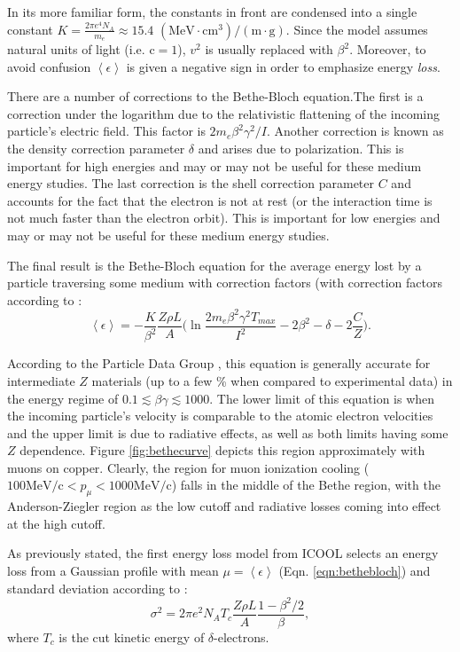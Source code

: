 In its more familiar form, the constants in front are condensed into a single constant $K=\frac{2\pi e^4 N_A}{m_e}\approx 15.4$ $ (\text{MeV}\cdot \text{cm}^3)/(\text{m}\cdot \text{g})$. Since the model assumes natural units of light (i.e. $\text{c}=1$), $v^2$ is usually replaced with $\beta ^2$. Moreover, to avoid confusion $\left<\epsilon\right>$ is given a negative sign in order to emphasize energy \emph{loss}.

There are a number of corrections to the Bethe-Bloch equation.The first is a correction under the logarithm due to the relativistic flattening of the incoming particle's electric field. This factor is  $2m_e \beta^2 \gamma^2 / I$. Another correction is known as the density correction parameter $\delta$ and arises due to polarization. This is important for high energies and may or may not be useful for these medium energy studies. The last correction is the shell correction parameter $C$ and accounts for the fact that the electron is not at rest (or the interaction time is not much faster than the electron orbit). This is important for low energies and may or may not be useful for these medium energy studies.

The final result is the Bethe-Bloch equation for the average energy lost by a particle traversing some medium with correction factors (with correction factors according to \cite{cosy}:
\begin{equation}\label{eqn:bethebloch}
\left< \epsilon \right> = -\frac{K}{\beta^2}\frac{Z\rho L}{A}\Big(\ln{\frac{2m_e \beta ^2 \gamma ^2 T_{max}}{I^2}}-2\beta^2-\delta-2\frac{C}{Z}\Big).
\end{equation}

According to the Particle Data Group \cite{PDG}, this equation is generally accurate for intermediate $Z$ materials (up to a few \% when compared to experimental data) in the energy regime of $0.1 \lesssim \beta \gamma \lesssim 1000$. The lower limit of this equation is when the incoming particle's velocity is comparable to the atomic electron velocities and the upper limit is due to radiative effects, as well as both limits having some $Z$ dependence. Figure \ref{fig:bethecurve} depicts this region approximately with muons on copper. Clearly, the region for muon ionization cooling ($100 \text{MeV/c} < p_\mu < 1000 \text{MeV/c}$) falls in the middle of the Bethe region, with the Anderson-Ziegler region as the low cutoff and radiative losses coming into effect at the high cutoff.

As previously stated, the first energy loss model from ICOOL selects an energy loss from a Gaussian profile with mean $\mu=\left<\epsilon \right>$ (Eqn. \ref{eqn:bethebloch}) and standard deviation according to \cite{geant4}:
\begin{equation}\label{eqn:bohrvariance}
\sigma^2=2\pi e^2 N_A T_c \frac{Z\rho L}{A} \frac{1-\beta^2/2}{\beta},
\end{equation}
where $T_c$ is the cut kinetic energy of $\delta$-electrons.

